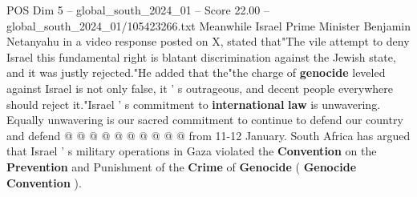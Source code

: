 \begin{textsample}{POS Dim 5 – global\_south\_2024\_01 – Score 22.00 – global\_south\_2024\_01/105423266.txt}
Meanwhile Israel Prime Minister Benjamin Netanyahu in a video response posted on X, stated that"The vile attempt to deny Israel this fundamental right is blatant discrimination against the Jewish state, and it was justly rejected."He added that the"the charge of \textbf{genocide} leveled against Israel is not only false, it ' s outrageous, and decent people everywhere should reject it."Israel ' s commitment to \textbf{international} \textbf{law} is unwavering.
Equally unwavering is our sacred commitment to continue to defend our country and defend @ @ @ @ @ @ @ @ @ @ from 11-12 January.
South Africa has argued that Israel ' s military operations in Gaza violated the \textbf{Convention} on the \textbf{Prevention} and Punishment of the \textbf{Crime} of \textbf{Genocide} ( \textbf{Genocide} \textbf{Convention} ).

\end{textsample}
